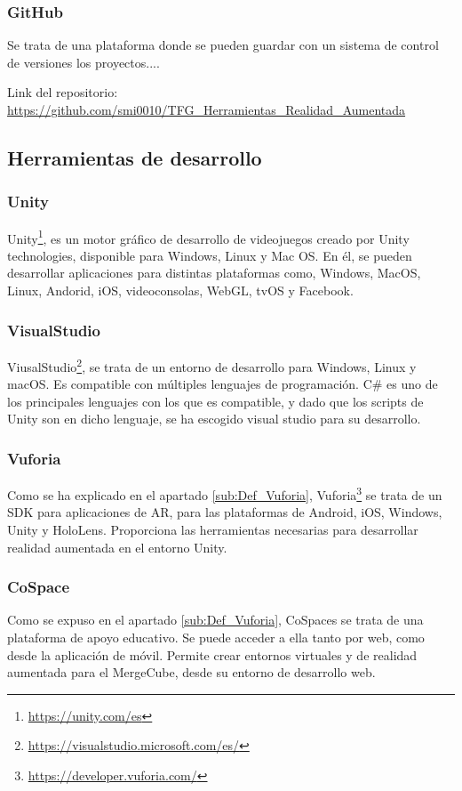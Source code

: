\subsubsection{GitHub}
Se trata de una plataforma donde se pueden guardar con un sistema de control de versiones los proyectos....

Link del repositorio: \url{https://github.com/smi0010/TFG_Herramientas_Realidad_Aumentada}

\subsection{Herramientas de desarrollo}
\subsubsection{Unity}
Unity\footnote{\url{https://unity.com/es}}, es un motor gráfico de desarrollo de videojuegos creado por Unity technologies, disponible para Windows, Linux y Mac OS. En él, se pueden desarrollar aplicaciones para distintas plataformas como, Windows, MacOS, Linux, Andorid, iOS, videoconsolas, WebGL, tvOS y Facebook.
\subsubsection{VisualStudio}
ViusalStudio\footnote{\url{https://visualstudio.microsoft.com/es/}}, se trata de un entorno de desarrollo para Windows, Linux y macOS. Es compatible con múltiples lenguajes de programación. C\# es uno de los principales lenguajes con los que es compatible, y dado que los scripts de Unity son en dicho lenguaje, se ha escogido visual studio para su desarrollo.



\subsubsection{Vuforia}
Como se ha explicado en el apartado \ref{sub:Def_Vuforia}, Vuforia\footnote{\url{https://developer.vuforia.com/}} se trata de un SDK para aplicaciones de AR, para las plataformas de Android, iOS, Windows, Unity y HoloLens. Proporciona las herramientas necesarias para desarrollar realidad aumentada en el entorno Unity.
\subsubsection{CoSpace}
Como se expuso en el apartado \ref{sub:Def_Vuforia}, CoSpaces se trata de una plataforma de apoyo educativo. Se puede acceder a ella tanto por web, como desde la aplicación de móvil. Permite crear entornos virtuales y de realidad aumentada para el MergeCube, desde su entorno de desarrollo web.


